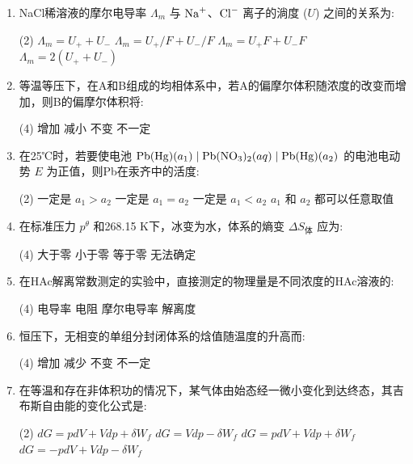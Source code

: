 \begin{enumerate}[label=\arabic*., itemsep=1.5ex]
    \item NaCl稀溶液的摩尔电导率 $\Lambda_m$ 与 $\ce{Na+}$、$\ce{Cl-}$ 离子的淌度 ($U$) 之间的关系为:
    \begin{tasks}(2)
        \task $\Lambda_m = U_+ + U_-$
        \task $\Lambda_m = U_+/F + U_-/F$
        \task $\Lambda_m = U_+F + U_-F$
        \task $\Lambda_m = 2(U_+ + U_-)$
    \end{tasks}

    \item 等温等压下，在A和B组成的均相体系中，若A的偏摩尔体积随浓度的改变而增加，则B的偏摩尔体积将:
    \begin{tasks}(4)
        \task 增加
        \task 减小
        \task 不变
        \task 不一定
    \end{tasks}

    \item 在25℃时，若要使电池 $\ce{Pb(Hg)}(a_1) \mid \ce{Pb(NO3)2}(aq) \mid \ce{Pb(Hg)}(a_2)$ 的电池电动势 $E$ 为正值，则Pb在汞齐中的活度:
    \begin{tasks}(2)
        \task 一定是 $a_1 > a_2$
        \task 一定是 $a_1 = a_2$
        \task 一定是 $a_1 < a_2$
        \task $a_1$ 和 $a_2$ 都可以任意取值
    \end{tasks}

    \item 在标准压力 $p^\theta$ 和268.15 K下，冰变为水，体系的熵变 $\Delta S_{\text{体}}$ 应为:
    \begin{tasks}(4)
        \task 大于零
        \task 小于零
        \task 等于零
        \task 无法确定
    \end{tasks}

    \item 在HAc解离常数测定的实验中，直接测定的物理量是不同浓度的HAc溶液的:
    \begin{tasks}(4)
        \task 电导率
        \task 电阻
        \task 摩尔电导率
        \task 解离度
    \end{tasks}

    \item 恒压下，无相变的单组分封闭体系的焓值随温度的升高而:
    \begin{tasks}(4)
        \task 增加
        \task 减少
        \task 不变
        \task 不一定
    \end{tasks}

    \item 在等温和存在非体积功的情况下，某气体由始态经一微小变化到达终态，其吉布斯自由能的变化公式是:
    \begin{tasks}(2)
        \task $dG = pdV + Vdp + \delta W_f$
        \task $dG = Vdp - \delta W_f$
        \task $dG = pdV + Vdp + \delta W_f$
        \task $dG = -pdV + Vdp - \delta W_f$
    \end{tasks}


\end{enumerate}
